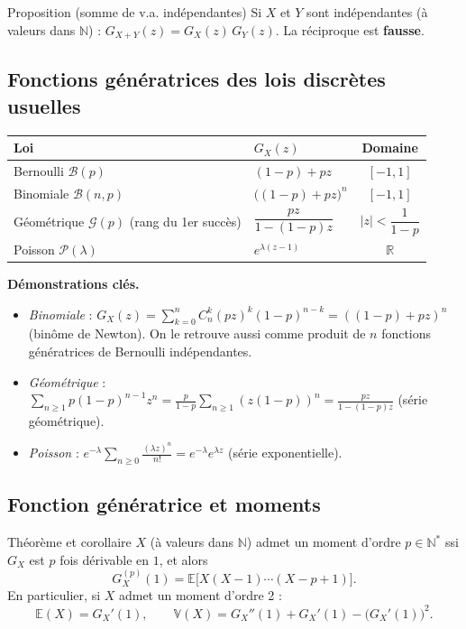 \documentclass[11pt,a4paper]{article}
\newcommand{\E}{\mathbb{E}}
\newcommand{\V}{\mathbb{V}}
\newcommand{\N}{\mathbb{N}}
\newcommand{\R}{\mathbb{R}}
\begin{document}
\begin{thm}{Proposition (somme de v.a. indépendantes)}
Si $X$ et $Y$ sont indépendantes (à valeurs dans $\N$) : $G_{X+Y}(z)=G_X(z)\,G_Y(z)$.
La réciproque est \textbf{fausse}.
\end{thm}

\subsection{Fonctions génératrices des lois discrètes usuelles}
\begin{center}
\renewcommand{\arraystretch}{1.5}
\begin{tabular}{@{}llc@{}}
\toprule
Loi & $G_X(z)$ & Domaine\\
\midrule
Bernoulli $\mathcal B(p)$ & $(1-p)+pz$ & $[-1,1]$\\
Binomiale $\mathcal B(n,p)$ & $\big((1-p)+pz\big)^n$ & $[-1,1]$\\
Géométrique $\mathcal G(p)$ (rang du 1er succès) & $\dfrac{pz}{1-(1-p)z}$ & $|z|<\dfrac1{1-p}$\\
Poisson $\mathcal P(\lambda)$ & $e^{\lambda(z-1)}$ & $\R$\\
\bottomrule
\end{tabular}
\end{center}

\textbf{Démonstrations clés.}
\begin{itemize}
\item \emph{Binomiale} : $G_X(z)=\sum_{k=0}^n C_n^k(pz)^k(1-p)^{n-k}=((1-p)+pz)^n$ (binôme de Newton). On le retrouve aussi comme produit de $n$ fonctions génératrices de Bernoulli indépendantes.
\item \emph{Géométrique} : $\sum_{n\ge1}p(1-p)^{n-1}z^n=\frac{p}{1-p}\sum_{n\ge1}(z(1-p))^n=\frac{pz}{1-(1-p)z}$ (série géométrique).
\item \emph{Poisson} : $e^{-\lambda}\sum_{n\ge0}\frac{(\lambda z)^n}{n!}=e^{-\lambda}e^{\lambda z}$ (série exponentielle).
\end{itemize}

\subsection{Fonction génératrice et moments}
\begin{thm}{Théorème et corollaire}
$X$ (à valeurs dans $\N$) admet un moment d'ordre $p\in\N^*$ ssi $G_X$ est $p$ fois dérivable en $1$, et alors
\[ G_X^{(p)}(1)=\E\big[X(X-1)\cdots(X-p+1)\big]. \]
En particulier, si $X$ admet un moment d'ordre 2 :
\[ \E(X)=G_X'(1),\qquad \V(X)=G_X''(1)+G_X'(1)-\big(G_X'(1)\big)^2. \]
\end{thm}
\end{document}
